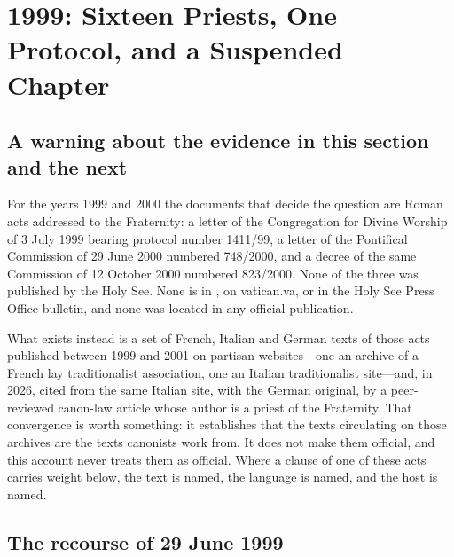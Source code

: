 \section{1999: Sixteen Priests, One Protocol, and a Suspended Chapter}

\subsection{A warning about the evidence in this section and the next}

For the years 1999 and 2000 the documents that decide the question are
Roman acts addressed to the Fraternity: a letter of the Congregation for
Divine Worship of 3 July 1999 bearing protocol number 1411/99, a letter of
the Pontifical Commission  of 29 June 2000 numbered
748/2000, and a decree of the same Commission of 12 October 2000 numbered
823/2000. None of the three was published by the Holy See. None is in
, on vatican.va, or in the Holy See Press
Office bulletin, and none was located in any official
publication.

What exists instead is a set of French, Italian and German texts of those
acts published between 1999 and 2001 on partisan websites---one an archive
of a French lay traditionalist association, one an Italian traditionalist
site---and, in 2026, cited from the same Italian site, with the German
original, by a peer-reviewed canon-law article whose author is a priest of
the Fraternity. That convergence is worth something: it establishes that
the texts circulating on those archives are the texts canonists work
from. It does not make them official, and this account never treats them
as official. Where a clause of one of these acts carries weight below, the
text is named, the language is named, and the host is named.

\subsection{The recourse of 29 June 1999}

